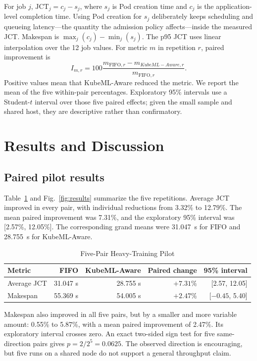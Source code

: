 \documentclass[10pt,journal,compsoc]{IEEEtran}
\newcommand{\system}{KubeML-Aware}
\newcommand{\jct}{\mathrm{JCT}}
\begin{document}
For job $j$, $\jct_j=c_j-s_j$, where $s_j$ is Pod creation time and $c_j$ is the application-level completion time. Using Pod creation for $s_j$ deliberately keeps scheduling and queueing latency---the quantity the admission policy affects---inside the measured JCT. Makespan is $\max_j(c_j)-\min_j(s_j)$. The p95 JCT uses linear interpolation over the 12 job values. For metric $m$ in repetition $r$, paired improvement is
\begin{equation}
I_{m,r}=100\frac{m_{\mathrm{FIFO},r}-m_{\system,r}}{m_{\mathrm{FIFO},r}}.
\end{equation}
Positive values mean that \system{} reduced the metric. We report the mean of the five within-pair percentages. Exploratory 95\% intervals use a Student-$t$ interval over those five paired effects; given the small sample and shared host, they are descriptive rather than confirmatory.

\balance
\section{Results and Discussion}

\subsection{Paired pilot results}

Table~\ref{tab:results} and Fig.~\ref{fig:results} summarize the five repetitions. Average JCT improved in every pair, with individual reductions from 3.32\% to 12.79\%. The mean paired improvement was 7.31\%, and the exploratory 95\% interval was [2.57\%, 12.05\%]. The corresponding grand means were 31.047~s for FIFO and 28.755~s for \system.

\begin{table}[t]
\caption{Five-Pair Heavy-Training Pilot}
\label{tab:results}
\centering
\footnotesize
\setlength{\tabcolsep}{2.5pt}
\begin{tabular}{lrrrr}
\toprule
Metric & FIFO & \system{} & Paired change & 95\% interval \\
\midrule
Average JCT & 31.047 s & 28.755 s & $+7.31\%$ & [2.57, 12.05] \\
Makespan    & 55.369 s & 54.005 s & $+2.47\%$ & [$-0.45$, 5.40] \\
\bottomrule
\end{tabular}
\end{table}

Makespan also improved in all five pairs, but by a smaller and more variable amount: 0.55\% to 5.87\%, with a mean paired improvement of 2.47\%. Its exploratory interval crosses zero. An exact two-sided sign test for five same-direction pairs gives $p=2/2^5=0.0625$. The observed direction is encouraging, but five runs on a shared node do not support a general throughput claim.
\end{document}
